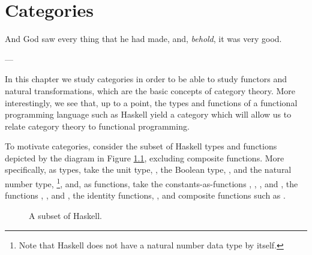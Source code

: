 \chapter{Categories}
\label{chap:categories}

\epigraph{
  And God saw every thing that he had made, and, \emph{behold}, it was
  very good.
}{---\textcite[Genesis 1:31]{god-1769}}

In this chapter we study categories in order to be able to study
functors and natural transformations, which are the basic concepts of
category theory. More interestingly, we see that, up to a point, the
types and functions of a functional programming language such as
Haskell yield a category which will allow us to relate category theory
to functional programming.

To motivate categories, consider the subset of Haskell types and
functions depicted by the diagram in Figure
\ref{fig:category-haskell}, excluding composite functions. More
specifically, as types, take the unit type, \texthaskell{()}, the
Boolean type, , and the natural number type,
\footnote{Note that Haskell does not have a natural
  number data type by itself.}, and, as functions, take the
constants-as-functions \texthaskell{()}, ,
, and , the functions
, , and , the
identity functions, , and composite functions such as
.

\begin{figure}[htb]
  \begin{center}
  \end{center}
  \caption{A subset of Haskell.}
  \label{fig:category-haskell}
\end{figure}

